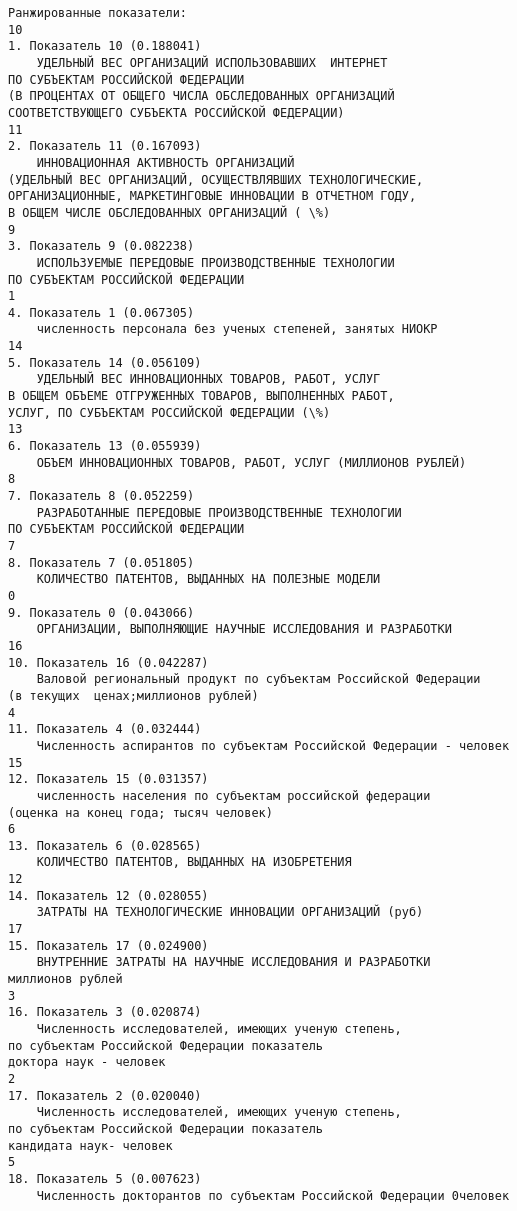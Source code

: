 \documentclass[11pt]{article}
\begin{document}
    \begin{Verbatim}[commandchars=\\\{\}]
Ранжированные показатели:
10
1. Показатель 10 (0.188041)
	УДЕЛЬНЫЙ ВЕС ОРГАНИЗАЦИЙ ИСПОЛЬЗОВАВШИХ  ИНТЕРНЕТ
ПО СУБЪЕКТАМ РОССИЙСКОЙ ФЕДЕРАЦИИ
(В ПРОЦЕНТАХ ОТ ОБЩЕГО ЧИСЛА ОБСЛЕДОВАННЫХ ОРГАНИЗАЦИЙ
СООТВЕТСТВУЮЩЕГО СУБЪЕКТА РОССИЙСКОЙ ФЕДЕРАЦИИ)
11
2. Показатель 11 (0.167093)
	ИННОВАЦИОННАЯ АКТИВНОСТЬ ОРГАНИЗАЦИЙ
(УДЕЛЬНЫЙ ВЕС ОРГАНИЗАЦИЙ, ОСУЩЕСТВЛЯВШИХ ТЕХНОЛОГИЧЕСКИЕ,
ОРГАНИЗАЦИОННЫЕ, МАРКЕТИНГОВЫЕ ИННОВАЦИИ В ОТЧЕТНОМ ГОДУ,
В ОБЩЕМ ЧИСЛЕ ОБСЛЕДОВАННЫХ ОРГАНИЗАЦИЙ ( \%)
9
3. Показатель 9 (0.082238)
	ИСПОЛЬЗУЕМЫЕ ПЕРЕДОВЫЕ ПРОИЗВОДСТВЕННЫЕ ТЕХНОЛОГИИ
ПО СУБЪЕКТАМ РОССИЙСКОЙ ФЕДЕРАЦИИ
1
4. Показатель 1 (0.067305)
	численность персонала без ученых степеней, занятых НИОКР
14
5. Показатель 14 (0.056109)
	УДЕЛЬНЫЙ ВЕС ИННОВАЦИОННЫХ ТОВАРОВ, РАБОТ, УСЛУГ
В ОБЩЕМ ОБЪЕМЕ ОТГРУЖЕННЫХ ТОВАРОВ, ВЫПОЛНЕННЫХ РАБОТ,
УСЛУГ, ПО СУБЪЕКТАМ РОССИЙСКОЙ ФЕДЕРАЦИИ (\%)
13
6. Показатель 13 (0.055939)
	ОБЪЕМ ИННОВАЦИОННЫХ ТОВАРОВ, РАБОТ, УСЛУГ (МИЛЛИОНОВ РУБЛЕЙ)
8
7. Показатель 8 (0.052259)
	РАЗРАБОТАННЫЕ ПЕРЕДОВЫЕ ПРОИЗВОДСТВЕННЫЕ ТЕХНОЛОГИИ
ПО СУБЪЕКТАМ РОССИЙСКОЙ ФЕДЕРАЦИИ
7
8. Показатель 7 (0.051805)
	КОЛИЧЕСТВО ПАТЕНТОВ, ВЫДАННЫХ НА ПОЛЕЗНЫЕ МОДЕЛИ
0
9. Показатель 0 (0.043066)
	ОРГАНИЗАЦИИ, ВЫПОЛНЯЮЩИЕ НАУЧНЫЕ ИССЛЕДОВАНИЯ И РАЗРАБОТКИ
16
10. Показатель 16 (0.042287)
	Валовой региональный продукт по субъектам Российской Федерации
(в текущих  ценах;миллионов рублей)
4
11. Показатель 4 (0.032444)
	Численность аспирантов по субъектам Российской Федерации - человек
15
12. Показатель 15 (0.031357)
	численность населения по субъектам российской федерации
(оценка на конец года; тысяч человек)
6
13. Показатель 6 (0.028565)
	КОЛИЧЕСТВО ПАТЕНТОВ, ВЫДАННЫХ НА ИЗОБРЕТЕНИЯ
12
14. Показатель 12 (0.028055)
	ЗАТРАТЫ НА ТЕХНОЛОГИЧЕСКИЕ ИННОВАЦИИ ОРГАНИЗАЦИЙ (руб)
17
15. Показатель 17 (0.024900)
	ВНУТРЕННИЕ ЗАТРАТЫ НА НАУЧНЫЕ ИССЛЕДОВАНИЯ И РАЗРАБОТКИ
миллионов рублей
3
16. Показатель 3 (0.020874)
	Численность исследователей, имеющих ученую степень,
по субъектам Российской Федерации показатель
доктора наук - человек
2
17. Показатель 2 (0.020040)
	Численность исследователей, имеющих ученую степень,
по субъектам Российской Федерации показатель
кандидата наук- человек
5
18. Показатель 5 (0.007623)
	Численность докторантов по субъектам Российской Федерации 0человек

    \end{Verbatim}

    \begin{center}
    \end{center}
    { \hspace*{\fill} \\}
    
\end{document}
